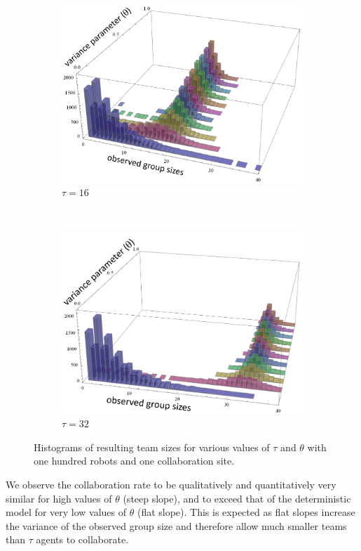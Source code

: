 \documentclass{svmult}  %
\begin{document}
\begin{figure}[!htb]
\begin{subfigure}{0.5\textwidth}
\centering\includegraphics[width=1.0\textwidth]{figures/collabratesweep16New.png}
\centering\caption{$\tau = 16$}\label{fig:collabsweep16}
\end{subfigure}~
\begin{subfigure}{0.5\textwidth}
\centering\includegraphics[width=1.0\textwidth]{figures/collabratesweep32New.png}
\centering\caption{$\tau = 32$}\label{fig:collabsweep32}
\end{subfigure}
\caption{Histograms of resulting team sizes for various values of $\tau$ and $\theta$ with one hundred robots and one collaboration site.}\label{fig:collabsweep}
\end{figure}

We observe the collaboration rate to be qualitatively and quantitatively very similar for high values of $\theta$ (steep slope), and to exceed that of the deterministic model for very low values of $\theta$ (flat slope). This is expected as flat slopes increase the variance of the observed group size and therefore allow much smaller teams than $\tau$ agents to collaborate.
\end{document}
